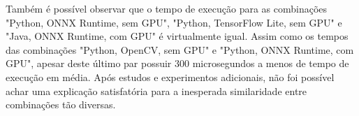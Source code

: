 Também é possível observar que o tempo de execução para as combinações "Python, ONNX Runtime, sem GPU", "Python, TensorFlow Lite, sem GPU" e "Java, ONNX Runtime, com GPU" é virtualmente igual. Assim como os tempos das combinações "Python, OpenCV, sem GPU" e "Python, ONNX Runtime, com GPU", apesar deste último par possuir 300 microsegundos a menos de tempo de execução em média. Após estudos e experimentos adicionais, não foi possível achar uma explicação satisfatória para a inesperada similaridade entre combinações tão diversas.
